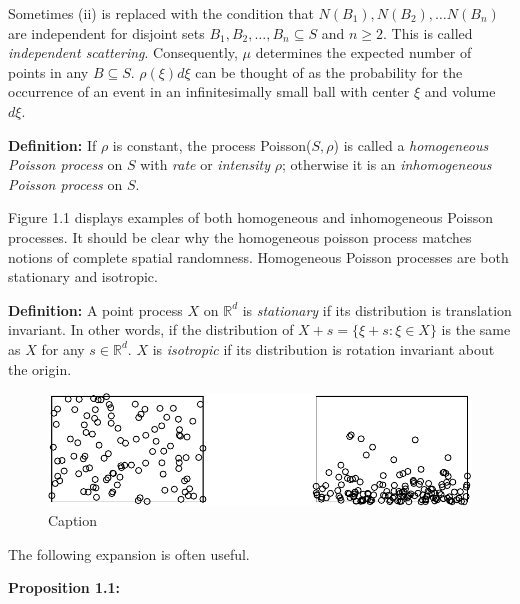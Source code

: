 \documentclass[12pt,twoside]{reedthesis}
\begin{document}
  Sometimes (ii) is replaced with the condition that
  \(N(B_1), N(B_2), \dots N(B_n)\) are independent for disjoint sets
  \(B_1, B_2, \dots, B_n \subseteq S\) and \(n\geq 2\). This is called
  \emph{independent scattering}. Consequently, \(\mu\) determines the
  expected number of points in any \(B\subseteq S\). \(\rho(\xi) d\xi\)
  can be thought of as the probability for the occurrence of an event in
  an infinitesimally small ball with center \(\xi\) and volume \(d\xi\).
  
  \textbf{Definition:} If \(\rho\) is constant, the process
  Poisson(\(S, \rho\)) is called a \emph{homogeneous Poisson process} on
  \(S\) with \emph{rate} or \emph{intensity} \(\rho\); otherwise it is an
  \emph{inhomogeneous Poisson process} on \(S\).
  
  Figure 1.1 displays examples of both homogeneous and inhomogeneous
  Poisson processes. It should be clear why the homogeneous poisson
  process matches notions of complete spatial randomness. Homogeneous
  Poisson processes are both stationary and isotropic.
  
  \textbf{Definition:} A point process \(X\) on \(\mathbb{R}^d\) is
  \emph{stationary} if its distribution is translation invariant. In other
  words, if the distribution of \(X + s = \{\xi + s: \xi\in X\}\) is the
  same as \(X\) for any \(s\in \mathbb{R}^d\). \(X\) is \emph{isotropic}
  if its distribution is rotation invariant about the origin.
  
  \begin{figure}
  
  {\centering \includegraphics{Draft_files/figure-latex/fig1_1-1} 
  
  }
  
  \caption[Caption]{Caption}\label{fig:fig1_1}
  \end{figure}
  
  The following expansion is often useful.
  
  \textbf{Proposition 1.1:}
  
\end{document}
